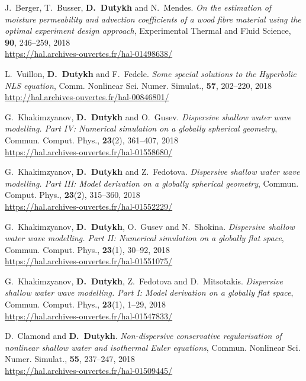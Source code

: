\documentclass[final, a4paper, oneside, 12pt]{article}
\numberwithin{equation}{section}
\begin{document}
\begin{etaremune}
  \item J.~Berger, T.~Busser, \textbf{D.~Dutykh} and N.~Mendes. \textit{On the estimation of moisture permeability and advection coefficients of a wood fibre material using the optimal experiment design approach}, Experimental Thermal and Fluid Science, \textbf{90}, 246--259, 2018 \\ %
  \url{https://hal.archives-ouvertes.fr/hal-01498638/}
  
  \item L.~Vuillon, \textbf{D.~Dutykh} and F.~Fedele. \textit{Some special solutions to the Hyperbolic NLS equation}, Comm. Nonlinear Sci. Numer. Simulat., \textbf{57}, 202--220, 2018 \\ %
  \url{http://hal.archives-ouvertes.fr/hal-00846801/}

  \item G.~Khakimzyanov, \textbf{D.~Dutykh} and O.~Gusev. \textit{Dispersive shallow water wave modelling. Part IV: Numerical simulation on a globally spherical geometry}, Commun. Comput. Phys., \textbf{23}(2), 361--407, 2018 \\ %
  \url{https://hal.archives-ouvertes.fr/hal-01558680/}

  \item G.~Khakimzyanov, \textbf{D.~Dutykh} and Z.~Fedotova. \textit{Dispersive shallow water wave modelling. Part III: Model derivation on a globally spherical geometry}, Commun. Comput. Phys., \textbf{23}(2), 315--360, 2018 \\ %
  \url{https://hal.archives-ouvertes.fr/hal-01552229/}

  \item G.~Khakimzyanov, \textbf{D.~Dutykh}, O.~Gusev and N.~Shokina. \textit{Dispersive shallow water wave modelling. Part II: Numerical simulation on a globally flat space}, Commun. Comput. Phys., \textbf{23}(1), 30--92, 2018 \\ %
  \url{https://hal.archives-ouvertes.fr/hal-01551075/}

  \item G.~Khakimzyanov, \textbf{D.~Dutykh}, Z.~Fedotova and D.~Mitsotakis. \textit{Dispersive shallow water wave modelling. Part I: Model derivation on a globally flat space}, Commun. Comput. Phys., \textbf{23}(1), 1--29, 2018 \\ %
  \url{https://hal.archives-ouvertes.fr/hal-01547833/}
  
  \item D.~Clamond and \textbf{D.~Dutykh}. \textit{Non-dispersive conservative regularisation of nonlinear shallow water and isothermal Euler equations}, Commun. Nonlinear Sci. Numer. Simulat., \textbf{55}, 237--247, 2018 \\ %
  \url{https://hal.archives-ouvertes.fr/hal-01509445/}
  

\end{etaremune}
\end{document}
